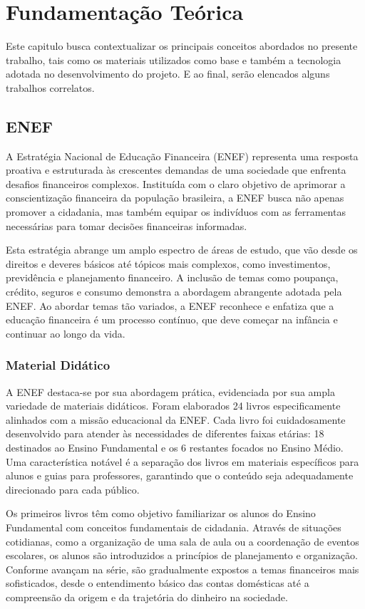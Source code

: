 \chapter{Fundamentação Teórica}
Este capitulo busca contextualizar os principais conceitos abordados no presente trabalho, tais como os materiais utilizados como base e também a tecnologia adotada no desenvolvimento do projeto. E ao final, serão elencados alguns trabalhos correlatos.

\section{ENEF}
A Estratégia Nacional de Educação Financeira (ENEF) representa uma resposta proativa e estruturada às crescentes demandas de uma sociedade que enfrenta desafios financeiros complexos. Instituída com o claro objetivo de aprimorar a conscientização financeira da população brasileira, a ENEF busca não apenas promover a cidadania, mas também equipar os indivíduos com as ferramentas necessárias para tomar decisões financeiras informadas.

Esta estratégia abrange um amplo espectro de áreas de estudo, que vão desde os direitos e deveres básicos até tópicos mais complexos, como investimentos, previdência e planejamento financeiro. A inclusão de temas como poupança, crédito, seguros e consumo demonstra a abordagem abrangente adotada pela ENEF. Ao abordar temas tão variados, a ENEF reconhece e enfatiza que a educação financeira é um processo contínuo, que deve começar na infância e continuar ao longo da vida.

\subsection{Material Didático}
A ENEF destaca-se por sua abordagem prática, evidenciada por sua ampla variedade de materiais didáticos. Foram elaborados 24 livros especificamente alinhados com a missão educacional da ENEF. Cada livro foi cuidadosamente desenvolvido para atender às necessidades de diferentes faixas etárias: 18 destinados ao Ensino Fundamental e os 6 restantes focados no Ensino Médio. Uma característica notável é a separação dos livros em materiais específicos para alunos e guias para professores, garantindo que o conteúdo seja adequadamente direcionado para cada público.

Os primeiros livros têm como objetivo familiarizar os alunos do Ensino Fundamental com conceitos fundamentais de cidadania. Através de situações cotidianas, como a organização de uma sala de aula ou a coordenação de eventos escolares, os alunos são introduzidos a princípios de planejamento e organização. Conforme avançam na série, são gradualmente expostos a temas financeiros mais sofisticados, desde o entendimento básico das contas domésticas até a compreensão da origem e da trajetória do dinheiro na sociedade.

